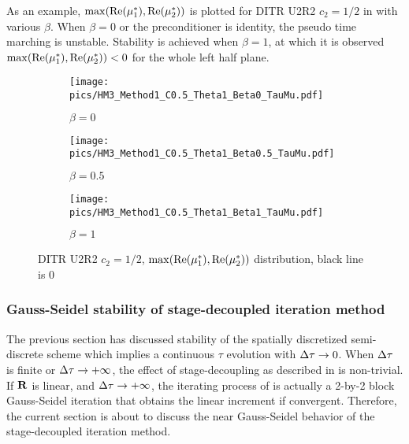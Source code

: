 
As an example, $\max(\mathrm{Re}(\mu^*_1),\mathrm{Re}(\mu^*_2))$ is plotted for
DITR U2R2 $c_2=1/2$ in  with various $\beta$.
When $\beta = 0$ or the preconditioner is identity, the pseudo time marching is
unstable. Stability is achieved when $\beta = 1$, 
at which it is observed $\max(\mathrm{Re}(\mu^*_1),\mathrm{Re}(\mu^*_2)) < 0$ for the whole left half plane.
\begin{figure}[htbp]
    \centering
    \begin{subfigure}{0.33\textwidth}
        \texttt{[image: pics/HM3\_Method1\_C0.5\_Theta1\_Beta0\_TauMu.pdf]}
        \caption[]{$\beta = 0$}
    \end{subfigure}\hfill
    \begin{subfigure}{0.33\textwidth}
        \texttt{[image: pics/HM3\_Method1\_C0.5\_Theta1\_Beta0.5\_TauMu.pdf]}
        \caption[]{$\beta = 0.5$}
    \end{subfigure}\hfill
    \begin{subfigure}{0.33\textwidth}
        \texttt{[image: pics/HM3\_Method1\_C0.5\_Theta1\_Beta1\_TauMu.pdf]}
        \caption[]{$\beta = 1$}
    \end{subfigure}
    \caption{DITR U2R2 $c_2=1/2$, $\max(\mathrm{Re}(\mu^*_1),\mathrm{Re}(\mu^*_2))$ distribution, black line is 0}
    \label{fig:MuU2R2}
\end{figure}


\subsubsection{Gauss-Seidel stability of stage-decoupled iteration method}
\label{sssec:GSStability}

The previous section has discussed stability of 
the spatially discretized 
semi-discrete scheme which implies a continuous $\tau$ evolution with
${\Delta} \tau \rightarrow 0$. 
When ${\Delta} \tau$ is finite
or ${\Delta} \tau \rightarrow +\infty$,
the effect of stage-decoupling as described in 
is non-trivial.
If $\mathbf{R}$ is linear, and ${\Delta} \tau \rightarrow +\infty$,
the iterating process of  is
actually a 2-by-2 block Gauss-Seidel iteration that obtains
the linear increment if convergent.
Therefore, the current section is about to discuss the
near Gauss-Seidel behavior of the stage-decoupled iteration method.

